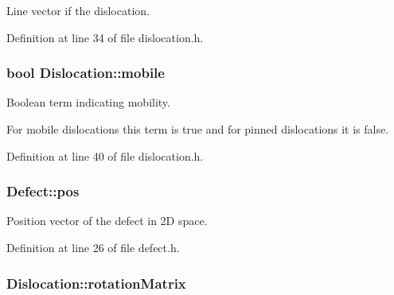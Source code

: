 \-Line vector if the dislocation. 



\-Definition at line 34 of file dislocation.\-h.

\hypertarget{classDislocation_a62c80daa260a3301baf1dceaab5d23d0}{
\subsubsection[{mobile}]{\setlength{\rightskip}{0pt plus 5cm}bool {\bf \-Dislocation\-::mobile}}}\label{d3/dc6/classDislocation_a62c80daa260a3301baf1dceaab5d23d0}


\-Boolean term indicating mobility. 

\-For mobile dislocations this term is true and for pinned dislocations it is false. 

\-Definition at line 40 of file dislocation.\-h.

\hypertarget{classDefect_aed2731c1beefc22e3db6ad5b18194cdd}{
\subsubsection[{pos}]{ {\bf \-Defect\-::pos}}}\label{d5/d4f/classDefect_aed2731c1beefc22e3db6ad5b18194cdd}


\-Position vector of the defect in 2\-D space. 



\-Definition at line 26 of file defect.\-h.

\hypertarget{classDislocation_a5699d2984949af836396c8b7e5f21a5e}{
\subsubsection[{rotation\-Matrix}]{ {\bf \-Dislocation\-::rotation\-Matrix}}}\label{d3/dc6/classDislocation_a5699d2984949af836396c8b7e5f21a5e}


